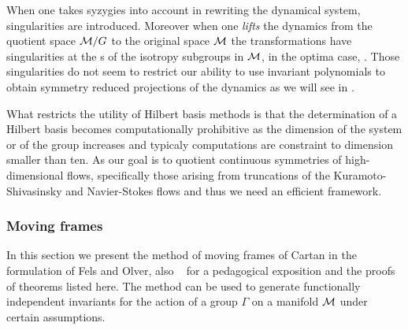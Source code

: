 When one takes syzygies into account in rewriting 
the dynamical system, singularities are introduced. Moreover when one \emph{lifts} the
dynamics from the quotient space $\mathcal{M}/G$ to the original space $\mathcal{M}$ the transformations
have singularities at the \fixedsp s of the isotropy subgroups in $\mathcal{M}$, in the optima case, \cf {}. Those singularities do not seem to restrict our ability to use invariant polynomials to obtain symmetry reduced projections of the dynamics as we will see in .

What restricts the utility of Hilbert basis methods is that the determination of a Hilbert basis becomes computationally prohibitive as the dimension of the system or of the group increases\cite{gatermannHab,ChossLaut00} and typicaly computations are constraint to dimension smaller than ten. As our goal is to quotient continuous symmetries of high-dimensional flows, specifically those arising from truncations of the Kuramoto-Shivasinsky and Navier-Stokes flows and thus we need an efficient
framework. 


\subsubsection{Moving frames} 

In this section we present the method of moving frames
of Cartan\cite{CartanMF} in the formulation of Fels and Olver, also \cf~ for
a pedagogical exposition and the proofs of theorems listed here. The method can be used to generate functionally independent invariants for the action of a group $\Gamma$ on a manifold $\mathcal{M}$ under certain assumptions. 

